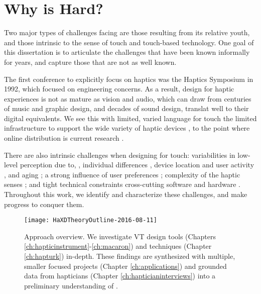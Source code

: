 \section{Why is \haxd Hard?}
Two major types of challenges facing \haxd are those resulting from its relative youth, and those intrinsic to the sense of touch and touch-based technology.
One goal of this dissertation is to articulate the challenges that have been known informally for years, and capture those that are not as well known.

The first conference to explicitly focus on haptics was the Haptics Symposium in 1992, which focused on engineering concerns.
As a result, design for haptic experiences is not as mature as  vision and audio, which can draw from centuries of music and graphic design, and decades of sound design, translat well to their digital equivalents.
We see this  with limited, varied language for touch \cite{Jansson-Boyd2011}  the limited infrastructure to support the wide variety of haptic devices \cite{Hayward2007}, to the point where online distribution is current research \cite{AbdurRahman2010}.

There are also intrinsic challenges when designing for touch:
variabilities in low-level perception due to, \eg, individual differences \cite{Lo1984}, device location and user activity \cite{Karuei2011}, and aging \cite{Stevens1996,Stevens1992};
a strong influence of user preferences \cite{Seifi2014,Seifi2015};
complexity of the haptic senses \cite{ChoiKuchenbecker2013,Lederman2009survey,Kandel2000};
and tight technical constraints cross-cutting software and hardware \cite{levitin2000perception,Hayward2007}.
Throughout this work, we identify and characterize these challenges, and make progress to conquer them.




\begin{figure}[htbp]
\begin{center}
\texttt{[image: HaXDTheoryOutline-2016-08-11]}
\caption{Approach overview. We investigate VT design tools (Chapters \ref{ch:hapticinstrument}-\ref{ch:macaron}) and techniques (Chapter \ref{ch:hapturk}) in-depth. These findings are synthesized with multiple, smaller focused projects (Chapter \ref{ch:applications}) and grounded data from hapticians (Chapter \ref{ch:hapticianinterviews}) into a preliminary understanding of \haxd.}
\label{fig:intro:methodologyoverview}
\end{center}
\end{figure}



